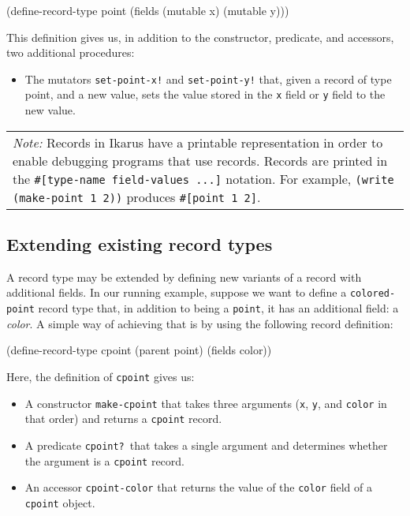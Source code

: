 \documentclass[onecolumn, 12pt, twoside, openright, dvipdfm]{book}
\newcommand{\BoxedText}[2]{
  \vspace{.05in}
  \begin{center}
    \begin{tabular}{|p{4.6in}|} {\large \emph{#1}} #2 \end{tabular}
  \end{center}
  \vspace{.05in}
}
\begin{document}
\begin{CodeInline}
(define-record-type point
  (fields (mutable x) (mutable y)))
\end{CodeInline}

This definition gives us, in addition to the constructor, predicate,
and accessors, two additional procedures:
\begin{itemize}
\item The mutators \texttt{set-point-x!} and \texttt{set-point-y!} that,
given a record of type point, and a new value, sets the value stored in the
\texttt{x} field or \texttt{y} field to the new value.
\end{itemize}


\BoxedText{Note:}{Records in Ikarus have a printable representation
in order to enable debugging programs that use records.  Records are
printed in the \texttt{\#[type-name field-values ...]} notation.
For example, \texttt{(write (make-point 1 2))} produces 
\texttt{\#[point 1 2]}.}

\subsection{Extending existing record types}

A record type may be extended by defining new variants of a record
with additional fields.  In our running example, suppose we want
to define a \texttt{colored-point} record type that, in addition to
being a \texttt{point}, it has an additional field: a \emph{color}.
A simple way of achieving that is by using the following record 
definition:

\begin{CodeInline}
(define-record-type cpoint
  (parent point)
  (fields color))
\end{CodeInline}

Here, the definition of \texttt{cpoint} gives us:
\begin{itemize}
\item A constructor \texttt{make-cpoint} that takes three arguments
(\texttt{x}, \texttt{y}, and \texttt{color} in that order) and returns a
\texttt{cpoint} record.
\item A predicate \texttt{cpoint?}\ that takes a single argument and
determines whether the argument is a \texttt{cpoint} record.
\item An accessor \texttt{cpoint-color} that returns the value of
the \texttt{color} field of a \texttt{cpoint} object.
\end{itemize}
\end{document}

